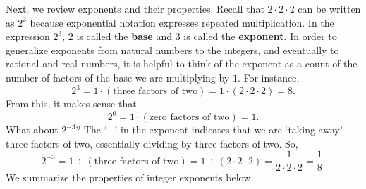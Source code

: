 \smallskip

Next, we review exponents and their properties.  Recall that $2 \cdot 2 \cdot 2$  can be written as $2^3$ because exponential notation expresses repeated multiplication.  In the expression $2^3$, $2$ is called the \textbf{base} and $3$ is called the \textbf{exponent}. In order to generalize exponents from natural numbers to the integers, and eventually to rational and real numbers, it is helpful to think of the exponent as a count of the number of factors of the base we are multiplying by $1$.  For instance, \[2^3 = 1 \cdot (\text{three factors of two}) = 1 \cdot (2 \cdot 2 \cdot 2) = 8.\] From this, it makes sense that \[2^{0} = 1 \cdot (\text{zero factors of two}) = 1.\]  What about $2^{-3}$?  The `$-$' in the exponent indicates that we are `taking away' three factors of two, essentially dividing by three factors of two.  So, \[2^{-3} = 1 \div (\text{three factors of two}) = 1 \div (2 \cdot 2 \cdot 2) = \frac{1}{2 \cdot 2 \cdot 2} = \frac{1}{8}.\]  We summarize the properties of integer exponents below.

\medskip


